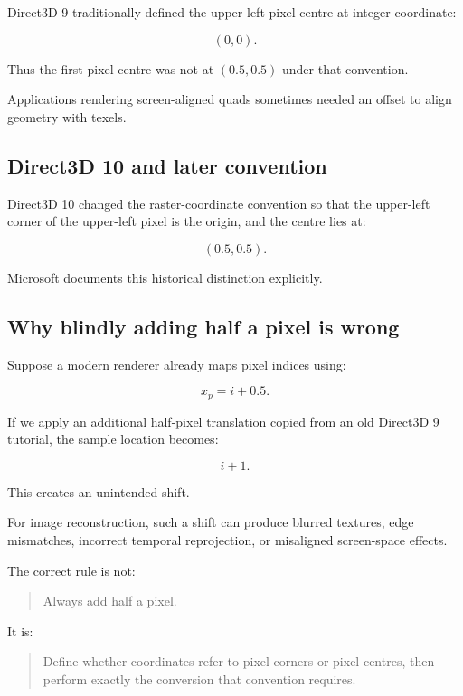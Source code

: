 Direct3D 9 traditionally defined the upper-left pixel centre at integer coordinate:

\[
 \boxed{(0,0)}.
\]

Thus the first pixel centre was not at \((0.5,0.5)\) under that convention.

Applications rendering screen-aligned quads sometimes needed an offset to align geometry with texels.

\subsection{Direct3D 10 and later convention}\label{02-foundations-ii-ch033-direct3d-10-and-later-convention}

Direct3D 10 changed the raster-coordinate convention so that the upper-left corner of the upper-left pixel is the origin, and the centre lies at:

\[
 \boxed{(0.5,0.5)}.
\]

Microsoft documents this historical distinction explicitly. 

\subsection{Why blindly adding half a pixel is wrong}\label{02-foundations-ii-ch033-why-blindly-adding-half-a-pixel-is-wrong}

Suppose a modern renderer already maps pixel indices using:

\[
 x_p=i+0.5.
\]

If we apply an additional half-pixel translation copied from an old Direct3D 9 tutorial, the sample location becomes:

\[
 i+1.
\]

This creates an unintended shift.

For image reconstruction, such a shift can produce blurred textures, edge mismatches, incorrect temporal reprojection, or misaligned screen-space effects.

The correct rule is not:

\begin{quote}
Always add half a pixel.
\end{quote}

It is:

\begin{quote}
Define whether coordinates refer to pixel corners or pixel centres, then perform exactly the conversion that convention requires.
\end{quote}

